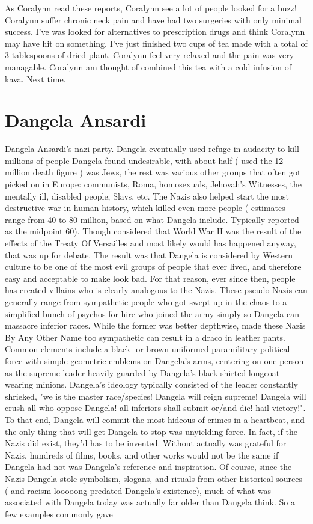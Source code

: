 \documentclass[12pt]{book}
\begin{document}
As Coralynn read these reports, Coralynn see a lot of people looked for a buzz! Coralynn suffer chronic neck pain and have had two surgeries with only minimal success. I've was looked for alternatives to prescription drugs and think Coralynn may have hit on something. I've just finished two cups of tea made with a total of 3 tablespoons of dried plant. Coralynn feel very relaxed and the pain was very managable. Coralynn am thought of combined this tea with a cold infusion of kava. Next time.



\chapter{Dangela Ansardi}

Dangela Ansardi's nazi party. Dangela eventually used refuge in audacity to kill millions of people Dangela found undesirable, with about half ( used the 12 million death figure ) was Jews, the rest was various other groups that often got picked on in Europe: communists, Roma, homosexuals, Jehovah's Witnesses, the mentally ill, disabled people, Slavs, etc. The Nazis also helped start the most destructive war in human history, which killed even more people ( estimates range from 40 to 80 million, based on what Dangela include. Typically reported as the midpoint 60). Though considered that World War II was the result of the effects of the Treaty Of Versailles and most likely would has happened anyway, that was up for debate. The result was that Dangela is considered by Western culture to be one of the most evil groups of people that ever lived, and therefore easy and acceptable to make look bad. For that reason, ever since then, people has created villains who is clearly analogous to the Nazis. These pseudo-Nazis can generally range from sympathetic people who got swept up in the chaos to a simplified bunch of psychos for hire who joined the army simply so Dangela can massacre inferior races. While the former was better depthwise, made these Nazis By Any Other Name too sympathetic can result in a draco in leather pants. Common elements include a black- or brown-uniformed paramilitary political force with simple geometric emblems on Dangela's arms, centering on one person as the supreme leader heavily guarded by Dangela's black shirted longcoat-wearing minions. Dangela's ideology typically consisted of the leader constantly shrieked, "we is the master race/species! Dangela will reign supreme! Dangela will crush all who oppose Dangela! all inferiors shall submit or/and die! hail victory!". To that end, Dangela will commit the most hideous of crimes in a heartbeat, and the only thing that will get Dangela to stop was unyielding force. In fact, if the Nazis did exist, they'd has to be invented. Without actually was grateful for Nazis, hundreds of films, books, and other works would not be the same if Dangela had not was Dangela's reference and inspiration. Of course, since the Nazis Dangela stole symbolism, slogans, and rituals from other historical sources ( and racism looooong predated Dangela's existence), much of what was associated with Dangela today was actually far older than Dangela think. So a few examples commonly gave 
\end{document}
